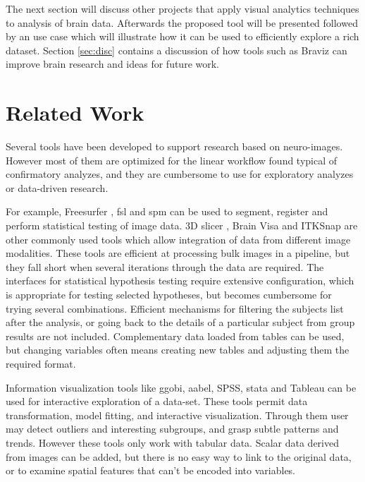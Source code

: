 \documentclass[utf8,paper]{frontiersSCNS} %
\begin{document}
The next section will discuss other projects that apply visual analytics techniques to analysis of brain data. Afterwards the proposed tool will be presented followed by an use case which will illustrate how it can be used to efficiently explore a rich dataset. Section \ref{sec:disc} contains a discussion of how tools such as Braviz can improve brain research and ideas for future work.


\section{Related Work}

Several tools have been developed to support research based on neuro-images. However most of them are optimized for the linear workflow found typical of confirmatory analyzes, and they are cumbersome to use for exploratory analyzes or data-driven research.

For example, Freesurfer  \citep{fischl_freesurfer_2012}, fsl\citep{jenkinson_fsl_2012} and spm \citep{friston_statistical_2006} can be used to segment, register and perform statistical testing of image data. 3D slicer \citep{fedorov_3d_2012}, Brain Visa \citep{cointepas_brainvisa:_2001} and ITKSnap \citep{yushkevich_user-guided_2006} are other commonly used tools which allow integration of data from different image modalities. These tools are efficient at processing bulk images in a pipeline, but they fall short when several iterations through the data are required. The interfaces for statistical hypothesis testing require extensive configuration, which is appropriate for testing selected hypotheses, but becomes cumbersome for trying several combinations. Efficient mechanisms for filtering the subjects list after the analysis, or going back to the details of a particular subject from group results are not included. Complementary data loaded from tables can be used, but changing variables often means creating new tables and adjusting them the required format.

Information visualization tools like ggobi\citep{cook_interactive_2007}, aabel, SPSS, stata and Tableau\citep{hanrahan_tableau_2003} can be used for interactive exploration of a data-set. These tools permit data transformation, model fitting, and interactive visualization. Through them user may detect outliers and interesting subgroups, and grasp subtle patterns and trends. However these tools only work with tabular data. Scalar data derived from images can be added, but there is no easy way to link to the original data, or to examine spatial features that can't be encoded into variables. 
\end{document}
